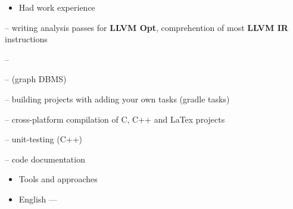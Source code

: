 \documentclass[10pt,a4paper,ragged2e,withhyper]{custom-altacv}
\begin{document}
\begin{paracol}{2}
\divider

\begin{itemize}
	\item \textcolor{emphasis}{Had work experience} 
\end{itemize}

 -- writing analysis passes for \textbf{LLVM Opt}, comprehention of most \textbf{LLVM IR} instructions
\vspace{1ex}

 -- 
\vspace{-.2ex}

 --  (graph DBMS)
\vspace{1ex}

 -- building projects with adding your own tasks (gradle tasks)
\vspace{1ex}

 -- cross-platform compilation of C, C++ and LaTex projects
\vspace{1ex}

 -- unit-testing (C++)
\vspace{1ex}

 -- code documentation
\vspace{1ex}

\vspace{1ex}

\divider

\begin{itemize}
	\item\textcolor{emphasis}{Tools and approaches}
\end{itemize}





\begin{itemize}
	\item English --- 
\end{itemize}

\end{paracol}
\end{document}
